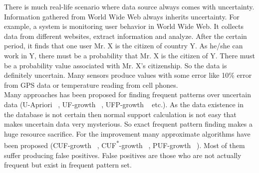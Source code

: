 There is much real-life scenario where data source always comes with uncertainty. Information gathered from World Wide Web always inherits uncertainty. For example, a system is monitoring user behavior in World Wide Web. It collects data from different websites, extract information and analyze. After the certain period, it finds that one user Mr. X is the citizen of country Y. As he/she can work in Y, there must be a probability that Mr. X is the citizen of Y. There must be a probability value associated with Mr. X's citizenship. So the data is definitely uncertain. Many sensors produce values with some error like 10\% error from GPS data or temperature reading from cell phones.\\
Many approaches has been proposed for finding frequent patterns over uncertain data (U-Apriori ~\cite{u_priori}, UF-growth ~\cite{uf_growth}, UFP-growth ~\cite{ufp_growth} etc.). As the data existence in the database is not certain then normal support calculation is not easy that makes uncertain data very mysterious. So exact frequent pattern finding makes a huge resource sacrifice. For the improvement many approximate algorithms have been proposed (CUF-growth ~\cite{cuf_growth}, CUF\textsuperscript{*}-growth ~\cite{cuf_growth}, PUF-growth ~\cite{puf_growth}). Most of them suffer producing false positives. False positives are those who are not actually frequent but exist in frequent pattern set.

